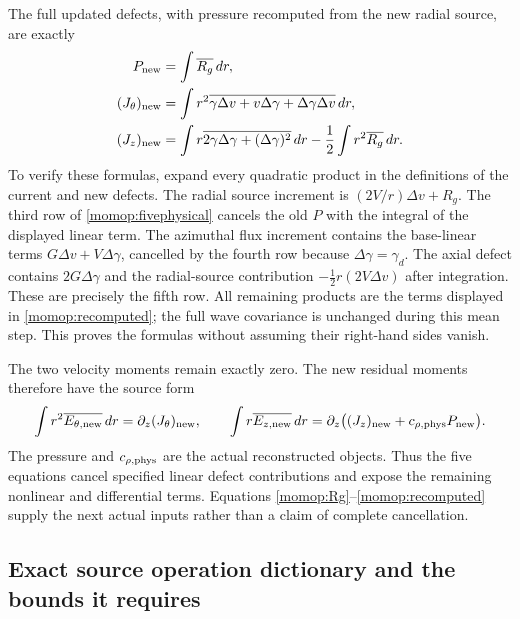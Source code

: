 \documentclass[11pt]{article}
\begin{document}
The full updated defects, with pressure recomputed from the new
radial source, are exactly
\begin{align}
 P_{\rm new}&=\int\overline{R_g}\,dr,\nonumber\\
 (J_\theta)_{\rm new}
    &=\int r^2\overline{\gamma\Delta v+v\Delta\gamma+
                                      \Delta\gamma\Delta v}\,dr,\nonumber\\
 (J_z)_{\rm new}
    &=\int r\overline{2\gamma\Delta\gamma+(\Delta\gamma)^2}\,dr
                      -\frac12\int r^2\overline{R_g}\,dr .
 \label{momop:recomputed}
\end{align}
To verify these formulas, expand every quadratic product in the
definitions of the current and new defects. The radial source
increment is $(2V/r)\Delta v+R_g$. The third row of
\eqref{momop:fivephysical} cancels the old $P$ with the integral
of the displayed linear term. The azimuthal flux increment contains
the base-linear terms $G\Delta v+V\Delta\gamma$, cancelled by
the fourth row because $\Delta\gamma=\gamma_d$. The axial defect
contains $2G\Delta\gamma$ and the radial-source contribution
$-\tfrac12r(2V\Delta v)$ after integration. These are precisely
the fifth row. All remaining products are the terms displayed
in \eqref{momop:recomputed}; the full wave covariance is unchanged
during this mean step. This proves the formulas without assuming
their right-hand sides vanish.

The two velocity moments remain exactly zero. The new residual
moments therefore have the source form
\[
 \int r^2\overline{E_{\theta,\rm new}}\,dr
       =\partial_z(J_\theta)_{\rm new},\qquad
 \int r\overline{E_{z,\rm new}}\,dr
       =\partial_z\bigl((J_z)_{\rm new}
                           +c_{\rho,\rm phys}P_{\rm new}\bigr).
\]
The pressure and $c_{\rho,\rm phys}$ are the actual reconstructed
objects. Thus the five equations cancel specified linear defect
contributions and expose the remaining nonlinear and differential
terms. Equations \eqref{momop:Rg}--\eqref{momop:recomputed} supply
the next actual inputs rather than a claim of complete cancellation.

\subsection{Exact source operation dictionary and the bounds it requires}
\end{document}

